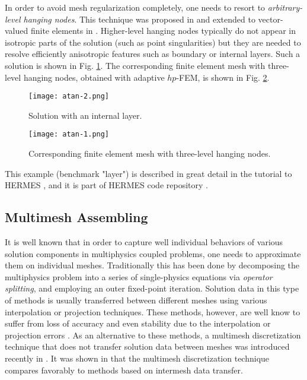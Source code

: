 \documentclass[final,3p,times,twocolumn]{elsarticle}
\begin{document}
In order to avoid mesh regularization completely, one needs to resort to 
{\em arbitrary-level hanging nodes}. This technique was proposed in 
\cite{hangno-1} and extended to vector-valued finite elements in \cite{hangno-2}.
Higher-level hanging nodes typically do not appear in isotropic parts 
of the solution (such as point singularities) but they are needed to
resolve efficiently anisotropic features such as boundary or internal
layers. Such a solution
is shown in Fig. \ref{fig:atan-2}. The corresponding finite element mesh with 
three-level hanging nodes, obtained with adaptive $hp$-FEM, is shown in 
Fig. \ref{fig:atan-1}.

\begin{figure}[!htb]
\begin{center}
 {
\texttt{[image: atan-2.png]}
}
\end{center}
\vspace{-5mm}
\caption{Solution with an internal layer.}
\label{fig:atan-2}
\end{figure}

\begin{figure}[!htb]
\begin{center}
 {
\texttt{[image: atan-1.png]}
}
\end{center}
\vspace{-5mm}
\caption{Corresponding finite element mesh with three-level hanging nodes.}
\label{fig:atan-1}
\end{figure}

This example (benchmark "layer") is described in great detail in the tutorial to 
HERMES \cite{hermes}, and it is part of HERMES code repository \cite{hermes-repo}.

\subsection{Multimesh Assembling}\label{subsec:multimesh}


It is well known that in order to capture well individual behaviors 
of various solution components in multiphysics coupled problems, 
one needs to approximate them on individual meshes. 
Traditionally this has been done by decomposing the multiphysics 
problem into a series of single-physics equations via {\em operator 
splitting}, and employing an outer fixed-point iteration. 
Solution data in this type of methods is 
usually transferred between different meshes using various 
interpolation or projection techniques. These methods, however, 
are well know to suffer from loss of accuracy and even stability 
due to the interpolation or projection errors \cite{jiao}. As an 
alternative to these methods, a multimesh discretization technique 
that does not transfer solution data between meshes
was introduced recently in \cite{spacetime-1,spacetime-2}. It was shown 
in \cite{dubcova} that the multimesh discretization technique
compares favorably to methods based on intermesh data transfer.
 
\end{document}
